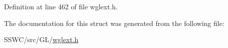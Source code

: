 Definition at line 462 of file wglext.\+h.



The documentation for this struct was generated from the following file\+:\begin{DoxyCompactItemize}
\item 
S\+S\+W\+C/src/\+G\+L/\hyperlink{wglext_8h}{wglext.\+h}\end{DoxyCompactItemize}
